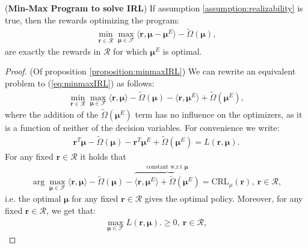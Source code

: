 \begin{proposition}
    \label{proposition:minmaxIRL}
    (\textbf{Min-Max Program to solve IRL})
    If assumption \ref{assumption:realizability} is true, then the rewards optimizing the program:
    \begin{equation}
        \label{eq:minmaxIRL}
        \begin{aligned}
            \min_{\bm{r}\in\mathcal{R}}\max_{\bm{\mu}\in\mathcal{F}} 
            \langle \bm{r}, \bm{\mu}-\bm{\mu}^E \rangle-\tilde{\Omega}(\bm{\mu}),
        \end{aligned}
    \end{equation}
    are exactly the rewards in $\mathcal{R}$ for which $\bm{\mu}^E$ is optimal.
\end{proposition}
\begin{proof}
    (Of proposition \ref{proposition:minmaxIRL}) We can rewrite an equivalent problem to (\ref{eq:minmaxIRL}) as follows:
    \begin{align*}
        \min_{\bm{r}\in\mathcal{R}}\max_{\bm{\mu}\in\mathcal{F}} 
        \langle \bm{r}, \bm{\mu} \rangle 
        - \tilde{\Omega}(\bm{\mu}) 
        - \langle \bm{r}, \bm{\mu}^E \rangle
        + \tilde{\Omega}(\bm{\mu}^E),
    \end{align*}
    where the addition of the $\tilde{\Omega}(\bm{\mu}^E)$ term has no influence on the optimizers, as it is a function of neither of the decision variables. For convenience we write:
    \begin{align*}
        \bm{r}^T\bm{\mu}-\tilde{\Omega}(\bm{\mu}) - \bm{r}^T \bm{\mu}^E + \tilde{\Omega}(\bm{\mu}^E) = L(\bm{r},\bm{\mu}).
    \end{align*}
    For any fixed $\bm{r}\in\mathcal{R}$ it holds that 
    \begin{align*}
        \arg\max_{\bm{\mu}\in\mathcal{F}} 
        \langle \bm{r}, \bm{\mu} \rangle
        -\tilde{\Omega}(\bm{\mu}) 
        - \overbrace{
            \langle \bm{r}, \bm{\mu}^E \rangle 
            + \tilde{\Omega}(\bm{\mu}^E)
        }^\text{constant w.r.t $\bm{\mu}$} = \text{CRL}_\mu(\bm{r}), ~\bm{r}\in \mathcal{R},
    \end{align*}
    i.e. the optimal $\bm{\mu}$ for any fixed $\bm{r} \in \mathcal{R}$ gives the optimal policy. Moreover, for any fixed $\bm{r} \in \mathcal{R}$, we get that:
    \begin{align*}
        \max_{\bm{\mu}\in\mathcal{F}} L(\bm{r},\bm{\mu}).\geq 0, ~\bm{r}\in \mathcal{R},
    \end{align*}

\end{proof}
